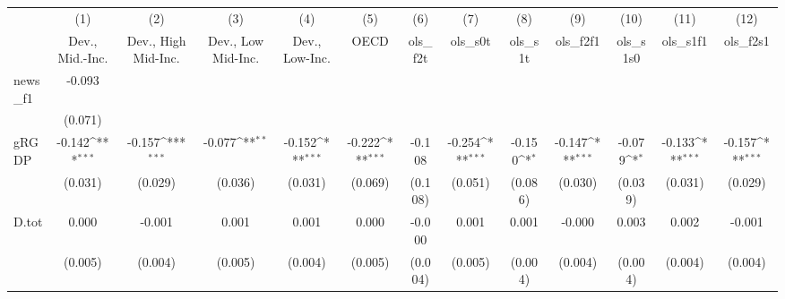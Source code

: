 {
\def\sym#1{\ifmmode^{#1}\else\(^{#1}\)\fi}
\begin{tabular}{l*{12}{c}}
\toprule
            &\multicolumn{1}{c}{(1)}&\multicolumn{1}{c}{(2)}&\multicolumn{1}{c}{(3)}&\multicolumn{1}{c}{(4)}&\multicolumn{1}{c}{(5)}&\multicolumn{1}{c}{(6)}&\multicolumn{1}{c}{(7)}&\multicolumn{1}{c}{(8)}&\multicolumn{1}{c}{(9)}&\multicolumn{1}{c}{(10)}&\multicolumn{1}{c}{(11)}&\multicolumn{1}{c}{(12)}\\
            &\multicolumn{1}{c}{Dev., Mid.-Inc.}&\multicolumn{1}{c}{Dev., High Mid-Inc.}&\multicolumn{1}{c}{Dev., Low Mid-Inc.}&\multicolumn{1}{c}{Dev., Low-Inc.}&\multicolumn{1}{c}{OECD}&\multicolumn{1}{c}{ols\_f2t}&\multicolumn{1}{c}{ols\_s0t}&\multicolumn{1}{c}{ols\_s1t}&\multicolumn{1}{c}{ols\_f2f1}&\multicolumn{1}{c}{ols\_s1s0}&\multicolumn{1}{c}{ols\_s1f1}&\multicolumn{1}{c}{ols\_f2s1}\\
\midrule
news\_f1     &      -0.093         &                     &                     &                     &                     &                     &                     &                     &                     &                     &                     &                     \\
            &     (0.071)         &                     &                     &                     &                     &                     &                     &                     &                     &                     &                     &                     \\
\addlinespace
gRGDP       &      -0.142\sym{***}&      -0.157\sym{***}&      -0.077\sym{**} &      -0.152\sym{***}&      -0.222\sym{***}&      -0.108         &      -0.254\sym{***}&      -0.150\sym{*}  &      -0.147\sym{***}&      -0.079\sym{*}  &      -0.133\sym{***}&      -0.157\sym{***}\\
            &     (0.031)         &     (0.029)         &     (0.036)         &     (0.031)         &     (0.069)         &     (0.108)         &     (0.051)         &     (0.086)         &     (0.030)         &     (0.039)         &     (0.031)         &     (0.029)         \\
\addlinespace
D.tot       &       0.000         &      -0.001         &       0.001         &       0.001         &       0.000         &      -0.000         &       0.001         &       0.001         &      -0.000         &       0.003         &       0.002         &      -0.001         \\
            &     (0.005)         &     (0.004)         &     (0.005)         &     (0.004)         &     (0.005)         &     (0.004)         &     (0.005)         &     (0.004)         &     (0.004)         &     (0.004)         &     (0.004)         &     (0.004)         \\

\end{tabular}}
